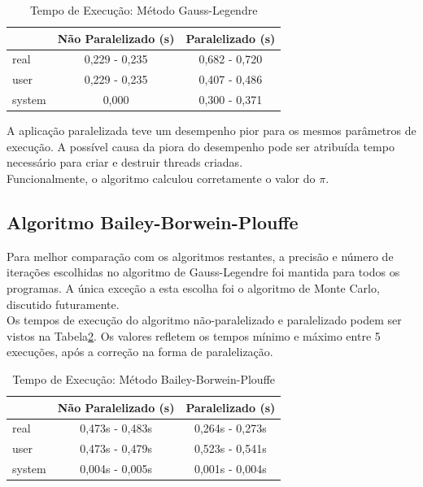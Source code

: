\documentclass[12pt]{article}
\begin{document}
\begin{table}[h]
	\centering
	\caption{Tempo de Execução: Método Gauss-Legendre}
	\begin{tabular}{|l|c|c|}
		\hline
		{}		& Não Paralelizado (s) & Paralelizado (s)\\
		\hline
		real 	& 0,229 - 0,235	& 0,682 - 0,720 \\
		user 	& 0,229 - 0,235	& 0,407 - 0,486 \\
		system 	& 0,000			& 0,300 - 0,371 \\
		\hline
	\end{tabular}
	\label{tab:table02}
\end{table}

A aplicação paralelizada teve um desempenho pior para os mesmos parâmetros de execução.
A possível causa da piora do desempenho pode ser atribuída tempo necessário para criar
e destruir threads criadas.\\

Funcionalmente, o algoritmo calculou corretamente o valor do $\pi$.\\

\subsection{Algoritmo Bailey-Borwein-Plouffe}

Para melhor comparação com os algoritmos restantes, a precisão e número de iterações
escolhidas no algoritmo de Gauss-Legendre foi mantida para todos os programas.
A única exceção a esta escolha foi o algoritmo de Monte Carlo, discutido futuramente.\\
Os tempos de execução do algoritmo não-paralelizado e paralelizado podem ser vistos na
Tabela\ref{tab:table03}. Os valores refletem os tempos mínimo e máximo entre 5 execuções,
após a correção na forma de paralelização.\\
 
\begin{table}[h]
	\centering
	\caption{Tempo de Execução: Método Bailey-Borwein-Plouffe}
	\begin{tabular}{|l|c|c|}
		\hline
		{}		& Não Paralelizado (s) & Paralelizado (s)\\
		\hline
		real 	& 0,473s - 0,483s	& 0,264s - 0,273s \\
		user 	& 0,473s - 0,479s	& 0,523s - 0,541s \\
		system 	& 0,004s - 0,005s	& 0,001s - 0,004s \\
		\hline
	\end{tabular}
	\label{tab:table03}
\end{table}
\end{document}

